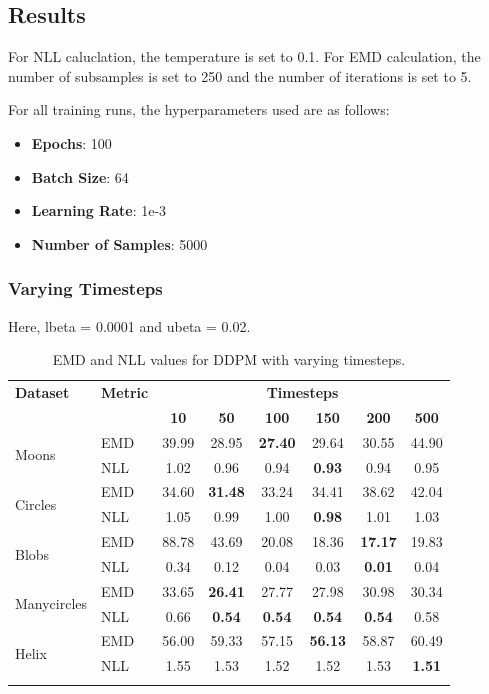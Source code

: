 \documentclass[11pt]{article}
\begin{document}
\subsection{Results}

For NLL caluclation, the temperature is set to 0.1.
For EMD calculation, the number of subsamples is set to 250 and the number of iterations is set to 5.

For all training runs, the hyperparameters used are as follows:
\begin{itemize}
    \item \textbf{Epochs}: 100
    \item \textbf{Batch Size}: 64
    \item \textbf{Learning Rate}: 1e-3
    \item \textbf{Number of Samples}: 5000
\end{itemize}

\subsubsection{Varying Timesteps}
Here, lbeta = 0.0001 and ubeta = 0.02.

\begin{longtable}{|l|l|c|c|c|c|c|c|}
    \hline
    \textbf{Dataset} & \textbf{Metric} & \multicolumn{6}{c|}{\textbf{Timesteps}} \\
    \cline{3-8}
    & & \textbf{10} & \textbf{50} & \textbf{100} & \textbf{150} & \textbf{200} & \textbf{500} \\
    \hline
    \multirow{2}{*}{Moons} & EMD & 39.99 & 28.95 & \textbf{27.40} & 29.64 & 30.55 & 44.90 \\
    \cline{2-8}
    & NLL & 1.02 & 0.96 & 0.94 & \textbf{0.93} & 0.94 & 0.95 \\
    \hline
    \multirow{2}{*}{Circles} & EMD & 34.60 & \textbf{31.48} & 33.24 & 34.41 & 38.62 & 42.04 \\
    \cline{2-8}
    & NLL & 1.05 & 0.99 & 1.00 & \textbf{0.98} & 1.01 & 1.03 \\
    \hline
    \multirow{2}{*}{Blobs} & EMD & 88.78 & 43.69 & 20.08 & 18.36 & \textbf{17.17} & 19.83 \\
    \cline{2-8}
    & NLL & 0.34 & 0.12 & 0.04 & 0.03 & \textbf{0.01} & 0.04 \\
    \hline
    \multirow{2}{*}{Manycircles} & EMD & 33.65 & \textbf{26.41} & 27.77 & 27.98 & 30.98 & 30.34 \\
    \cline{2-8}
    & NLL & 0.66 & \textbf{0.54} & \textbf{0.54} & \textbf{0.54} & \textbf{0.54} & 0.58 \\
    \hline
    \multirow{2}{*}{Helix} & EMD & 56.00 & 59.33 & 57.15 & \textbf{56.13} & 58.87 & 60.49 \\
    \cline{2-8}
    & NLL & 1.55 & 1.53 & 1.52 & 1.52 & 1.53 & \textbf{1.51} \\
    \hline
    \caption{EMD and NLL values for DDPM with varying timesteps.}
\end{longtable}
\end{document}
